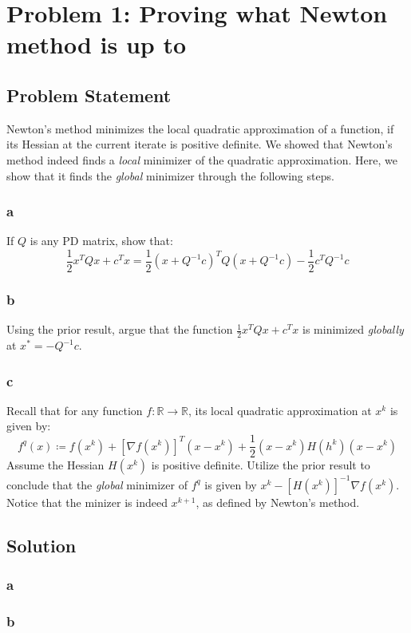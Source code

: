 \documentclass[11pt]{report}
\theoremstyle{definition}
\begin{document}
\section*{Problem 1: Proving what Newton method is up to}
\subsection*{Problem Statement}
Newton's method minimizes the local quadratic approximation of a function, if
its Hessian at the current iterate is positive definite. We showed that Newton's
method indeed finds a \textit{local} minimizer of the quadratic approximation.
Here, we show that it finds the \textit{global} minimizer through the following
steps.

\subsubsection*{a}
If $Q$ is any PD matrix, show that:
\[ \frac{1}{2}x^TQx+c^Tx =  \frac{1}{2}(x+Q^{-1}c)^TQ(x+Q^{-1}c)-\frac{1}{2}c^TQ^{-1}c \]

\subsubsection*{b}
Using the prior result, argue that the function $\frac{1}{2}x^TQx+c^Tx$ is
minimized \textit{globally} at $x^*=-Q^{-1}c$.

\subsubsection*{c}
Recall that for any function $f:\mathbb{R}\rightarrow\mathbb{R}$, its local quadratic
approximation at $x^k$ is given by:
\[
	f^{q}(x) \coloneqq
	f(x^k)+[\nabla f(x^k)]^T(x-x^k)+\frac{1}{2}(x-x^k)H(h^k)(x-x^k)
\]
Assume the Hessian $H(x^k)$ is positive definite. Utilize the prior result to
conclude that the \textit{global} minimizer of $f^q$ is given by
$x^k-[H(x^k)]^{-1}\nabla f(x^k)$. Notice that the minizer is indeed $x^{k+1}$,
as defined by Newton's method.


\subsection*{Solution}
\subsubsection*{a}

\subsubsection*{b}
\end{document}
